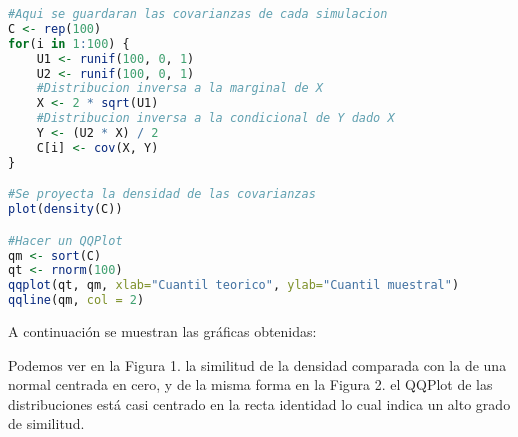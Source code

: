 \documentclass[12pt]{article}
\begin{document}
\begin{lstlisting}[language=R]
#Aqui se guardaran las covarianzas de cada simulacion
C <- rep(100)
for(i in 1:100) {
	U1 <- runif(100, 0, 1)
	U2 <- runif(100, 0, 1)
	#Distribucion inversa a la marginal de X
	X <- 2 * sqrt(U1)
	#Distribucion inversa a la condicional de Y dado X
	Y <- (U2 * X) / 2
	C[i] <- cov(X, Y)
}

#Se proyecta la densidad de las covarianzas
plot(density(C))

#Hacer un QQPlot
qm <- sort(C)
qt <- rnorm(100)
qqplot(qt, qm, xlab="Cuantil teorico", ylab="Cuantil muestral")
qqline(qm, col = 2)
\end{lstlisting}

A continuación se muestran las gráficas obtenidas:
\begin{figure}[H]
	\centering
	\hfill
\end{figure}

\begin{figure}[H]
	\centering
	\hfill
\end{figure}

Podemos ver en la Figura 1. la similitud de la densidad comparada con la de una normal centrada en cero, y de la misma forma en la Figura 2. el QQPlot de las distribuciones está casi centrado en la recta identidad lo cual indica un alto grado de similitud.
\end{document}
